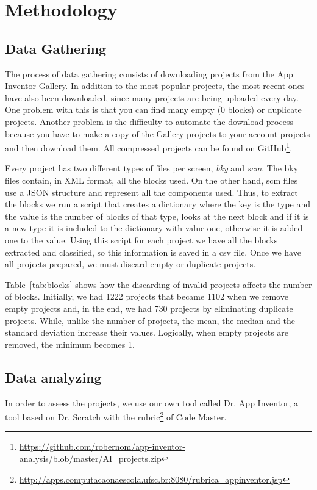 \documentclass[a4paper]{article}
\begin{document}
\section{Methodology}

\subsection{Data Gathering}

The process of data gathering consists of downloading projects from the App Inventor Gallery. In addition to the most popular projects, the most recent ones have also been downloaded, since many projects are being uploaded every day. One problem with this is that you can find many empty (0 blocks) or duplicate projects. Another problem is the difficulty to automate the download process because you have to make a copy of the Gallery projects to your account projects and then download them. All compressed projects can be found on GitHub\footnote{\url{https://github.com/robernom/app-inventor-analysis/blob/master/AI_projects.zip}}.

Every project has two different types of files per screen, \emph{bky} and \emph{scm}. The bky files contain, in XML format, all the blocks used. On the other hand, scm files use a JSON structure and represent all the components used. Thus, to extract the blocks we run a script that creates a dictionary where the key is the type and the value is the number of blocks of that type, looks at the next block and if it is a new type it is included to the dictionary with value one, otherwise it is added one to the value. Using this script for each project we have all the blocks extracted and classified, so this information is saved in a csv file. Once we have all projects prepared, we must discard empty or duplicate projects. 

Table~\ref{tab:blocks} shows how the discarding of invalid projects affects the number of blocks. Initially, we had 1222 projects that became 1102 when we remove empty projects and, in the end, we had 730 projects by eliminating duplicate projects. While, unlike the number of projects, the mean, the median and the standard deviation increase their values. Logically, when empty projects are removed, the minimum becomes 1.

\subsection{Data analyzing}
In order to assess the projects, we use our own tool called Dr. App Inventor, a tool based on Dr. Scratch with the 
rubric\footnote{\url{http://apps.computacaonaescola.ufsc.br:8080/rubrica_appinventor.jsp}} of Code Master.
\end{document}
